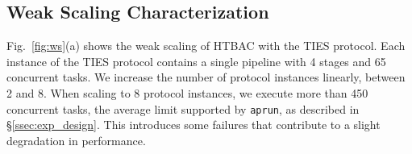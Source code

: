 

\subsection{Weak Scaling Characterization}


Fig.~\ref{fig:ws}(a) shows the weak scaling of HTBAC with the TIES protocol.
Each instance of the TIES protocol contains a single pipeline with 4 stages
and 65 concurrent tasks. We increase the number of protocol instances
linearly, between 2 and 8. When scaling to 8 protocol instances, we execute
more than 450 concurrent tasks, the average limit supported by
\texttt{aprun}, as described in \S\ref{ssec:exp_design}. This introduces some failures that contribute to a slight degradation in performance. 


